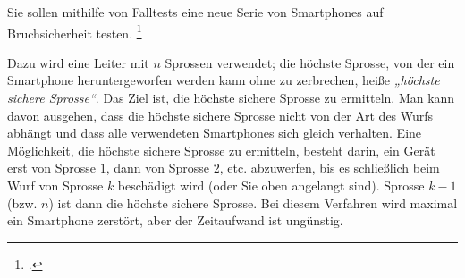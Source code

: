 \documentclass{bschlangaul-aufgabe}
\begin{document}

Sie sollen mithilfe von Falltests eine neue Serie von Smartphones auf
Bruchsicherheit testen.
\footcite{examen:46115:2016:03}

Dazu wird eine Leiter mit $n$ Sprossen verwendet; die höchste Sprosse,
von der ein Smartphone heruntergeworfen werden kann ohne zu zerbrechen,
heiße \emph{„höchste sichere Sprosse“}. Das Ziel ist, die höchste
sichere Sprosse zu ermitteln. Man kann davon ausgehen, dass die höchste
sichere Sprosse nicht von der Art des Wurfs abhängt und dass alle
verwendeten Smartphones sich gleich verhalten. Eine Möglichkeit, die
höchste sichere Sprosse zu ermitteln, besteht darin, ein Gerät erst von
Sprosse $1$, dann von Sprosse $2$, etc. abzuwerfen, bis es schließlich
beim Wurf von Sprosse $k$ beschädigt wird (oder Sie oben angelangt
sind). Sprosse $k - 1$ (bzw. $n$) ist dann die höchste sichere Sprosse.
Bei diesem Verfahren wird maximal ein Smartphone zerstört, aber der
Zeitaufwand ist ungünstig.
\end{document}
